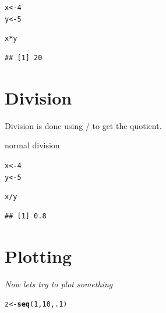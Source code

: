 \documentclass{article}\usepackage[]{graphicx}\usepackage[]{color}
\makeatletter
\newcommand{\hlnum}[1]{\textcolor[rgb]{0.686,0.059,0.569}{#1}}%
\newcommand{\hlopt}[1]{\textcolor[rgb]{0,0,0}{#1}}%
\newcommand{\hlstd}[1]{\textcolor[rgb]{0.345,0.345,0.345}{#1}}%
\newcommand{\hlkwb}[1]{\textcolor[rgb]{0.69,0.353,0.396}{#1}}%
\newcommand{\hlkwd}[1]{\textcolor[rgb]{0.737,0.353,0.396}{\textbf{#1}}}%
\newenvironment{kframe}{%
 \def\at@end@of@kframe{}%
 \ifinner\ifhmode%
  \def\at@end@of@kframe{\end{minipage}}%
  \begin{minipage}{\columnwidth}%
 \fi\fi%
 \def\FrameCommand##1{\hskip\@totalleftmargin \hskip-\fboxsep
 \colorbox{shadecolor}{##1}\hskip-\fboxsep
     \hskip-\linewidth \hskip-\@totalleftmargin \hskip\columnwidth}%
 \MakeFramed {\advance\hsize-\width
   \@totalleftmargin\z@ \linewidth\hsize
   \@setminipage}}%
 {\par\unskip\endMakeFramed%
 \at@end@of@kframe}
\newenvironment{knitrout}{}{} %
\makeatother
\begin{document}
\begin{knitrout}
\color{fgcolor}\begin{kframe}
\begin{alltt}
\hlstd{x}\hlkwb{<-}\hlnum{4}
\hlstd{y}\hlkwb{<-}\hlnum{5}

\hlstd{x}\hlopt{*}\hlstd{y}
\end{alltt}
\begin{verbatim}
## [1] 20
\end{verbatim}
\end{kframe}
\end{knitrout}


\section{Division}
\noindent Division is done using / to get the quotient.

\noindent normal division
\begin{knitrout}
\color{fgcolor}\begin{kframe}
\begin{alltt}
\hlstd{x}\hlkwb{<-}\hlnum{4}
\hlstd{y}\hlkwb{<-}\hlnum{5}

\hlstd{x}\hlopt{/}\hlstd{y}
\end{alltt}
\begin{verbatim}
## [1] 0.8
\end{verbatim}
\end{kframe}
\end{knitrout}

\section{Plotting}

\textit{Now lets try to plot something}

\begin{knitrout}
\color{fgcolor}\begin{kframe}
\begin{alltt}
\hlstd{z}\hlkwb{<-}\hlkwd{seq}\hlstd{(}\hlnum{1}\hlstd{,}\hlnum{10}\hlstd{,}\hlnum{.1}\hlstd{)}
\end{alltt}
\end{kframe}
\end{knitrout}
\end{document}
